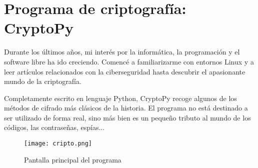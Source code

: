 \section{Programa de criptografía: CryptoPy}

Durante los últimos años, mi interés por la informática, la programación y el software libre ha ido creciendo. Comencé a familiarizarme con entornos Linux y a leer artículos relacionados con la ciberseguridad hasta descubrir el apasionante mundo de la criptografía.

Completamente escrito en lenguaje Python, CryptoPy recoge algunos de los métodos de cifrado más clásicos de la historia. El programa no está destinado a ser utilizado de forma real, sino más bien es un pequeño tributo al mundo de los códigos, las contraseñas, espías...

\begin{wrapfigure}{r}{0.5\linewidth}
	\centering
	\texttt{[image: cripto.png]}
	\caption*{Pantalla principal del programa}
	\label{labelformat=empty}
\end{wrapfigure}